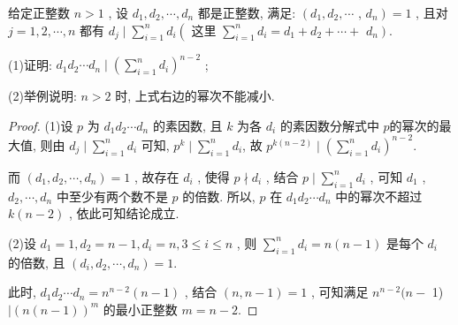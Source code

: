 \begin{example}
	给定正整数 $n>1$ , 设 $d_{1}, d_{2}, \cdots, d_{n}$ 都是正整数, 满足:  $\left(d_{1}, d_{2}, \cdots\right.$ ,  $\left.d_{n}\right)=1$ , 且对 $j=1,2, \cdots, n$ 都有 $d_{j} \mid \sum_{i=1}^{n} d_{i}\left(\right.$ 这里 $\sum_{i=1}^{n} d_{i}=d_{1}+d_{2}+\cdots+$ $\left.d_{n}\right)$.

	(1)证明: $d_{1} d_{2} \cdots d_{n} \mid\left(\sum_{i=1}^{n} d_{i}\right)^{n-2}$ ;

	(2)举例说明:  $n>2$ 时, 上式右边的幂次不能减小.
\end{example}
\begin{proof}
	(1)设 $p$ 为 $d_{1} d_{2} \cdots d_{n}$ 的素因数, 且 $k$ 为各 $d_{i}$ 的素因数分解式中 $p$的幂次的最大值, 则由 $d_{j} \mid \sum_{i=1}^{n} d_{i}$ 可知, $p^{k} \mid \sum_{i=1}^{n} d_{i}$, 故 $p^{k(n-2)} \mid\left(\sum_{i=1}^{n} d_{i}\right)^{n-2}$.

	而 $\left(d_{1}, d_{2}, \cdots, d_{n}\right)=1$ , 故存在 $d_{i}$ , 使得 $p \nmid d_{i}$ , 结合 $p \mid \sum_{i=1}^{n} d_{i}$ , 可知 $d_{1}$ ,  $d_{2}, \cdots, d_{n}$ 中至少有两个数不是 $p$ 的倍数. 所以, $p$ 在 $d_{1} d_{2} \cdots d_{n}$ 中的幂次不超过 $k(n-2)$ , 依此可知结论成立.

	(2)设 $d_{1}=1, d_{2}=n-1, d_{i}=n, 3 \leqslant i \leqslant n$ , 则 $\sum_{i=1}^{n} d_{i}=n(n-1)$ 是每个 $d_{i}$ 的倍数, 且 $\left(d_{i}, d_{2}, \cdots, d_{n}\right)=1$.

	此时,  $d_{1} d_{2} \cdots d_{n}=n^{n-2}(n-1)$ , 结合 $(n, n-1)=1$ , 可知满足 $n^{n-2}(n-$ 1) $\mid(n(n-1))^{m}$ 的最小正整数 $m=n-2$.
\end{proof}

\newpage
